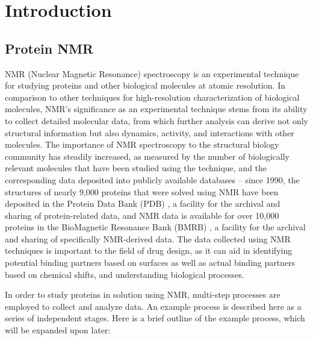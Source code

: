\documentclass[a4paper]{report}
\begin{document}

\tableofcontents

\listoftables

\listoffigures

\chapter{Introduction}
\section{Protein NMR}
NMR (Nuclear Magnetic Resonance) spectroscopy is an experimental technique for 
studying proteins and other biological molecules at atomic resolution.  In 
comparison to other techniques for high-resolution characterization of 
biological molecules, NMR’s significance as an experimental technique stems 
from its ability to collect detailed molecular data, from which further 
analysis can derive not only structural information but also dynamics, 
activity, and interactions with other molecules.  The importance of NMR 
spectroscopy to the structural biology community has steadily increased, as 
measured by the number of biologically relevant molecules that have been 
studied using the technique, and the corresponding data deposited into 
publicly available databases -- since 1990, the structures of nearly 9,000 
proteins that were solved using NMR have been deposited in the Protein Data 
Bank (PDB) \cite{pdb}, a facility for the archival and sharing of protein-related 
data, and NMR data is available for over 10,000 proteins in the BioMagnetic 
Resonance Bank (BMRB) \cite{bmrb}, a facility for the archival and sharing of 
specifically NMR-derived data.  The data collected using NMR techniques is 
important to the field of drug design, as it can aid in identifying potential 
binding partners based on surfaces as well as actual binding partners based on 
chemical shifts, and understanding biological processes.

In order to study proteins in solution using NMR, multi-step processes are 
employed to collect and analyze data.  An example process is described here 
as a series of independent stages.  Here is a brief outline of the example 
process, which will be expanded upon later:
\end{document}
